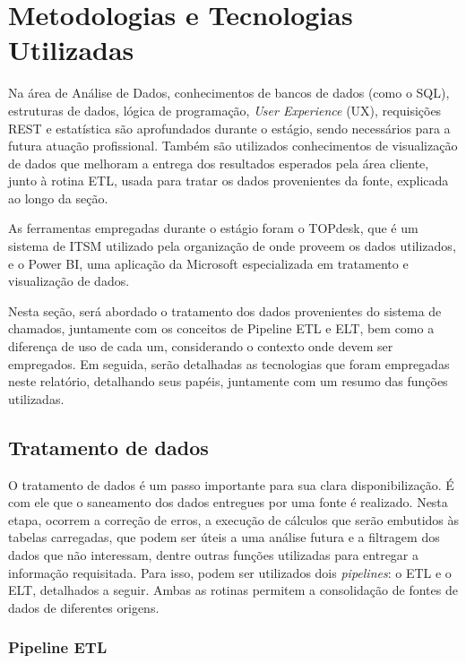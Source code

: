 \chapter{Metodologias e Tecnologias Utilizadas}
\label{cap:relacionados}

Na área de Análise de Dados, conhecimentos de bancos de dados (como o SQL), estruturas de dados, lógica de programação, \textit{User Experience} (UX), requisições REST e estatística são aprofundados durante o estágio, sendo necessários para a futura atuação profissional. Também são utilizados conhecimentos de visualização de dados que melhoram a entrega dos resultados esperados pela área cliente, junto à rotina ETL, usada para tratar os dados provenientes da fonte, explicada ao longo da seção. 

As ferramentas empregadas durante o estágio foram o TOPdesk, que é um sistema de ITSM utilizado pela organização de onde proveem os dados utilizados, e o Power BI, uma aplicação da Microsoft especializada em tratamento e visualização de dados.


Nesta seção, será abordado o tratamento dos dados provenientes do sistema de chamados, juntamente com os conceitos de Pipeline ETL e ELT, bem como  a diferença de uso de cada um, considerando o contexto onde devem ser empregados. Em seguida, serão detalhadas as tecnologias que foram empregadas neste relatório, detalhando seus papéis, juntamente com um resumo das funções utilizadas.

\section{Tratamento de dados}


O tratamento de dados é um passo importante para sua clara disponibilização. É com ele que o saneamento dos dados entregues por uma fonte é realizado. Nesta etapa, ocorrem a correção de erros, a execução de cálculos que serão embutidos às tabelas carregadas, que podem ser úteis a uma análise futura e a filtragem dos dados que não interessam, dentre outras funções utilizadas para entregar a informação requisitada. Para isso, podem ser utilizados dois \textit{pipelines}: o ETL e o ELT,  detalhados a seguir. Ambas as rotinas permitem a consolidação de fontes de dados de diferentes origens.


\subsection{Pipeline ETL}


